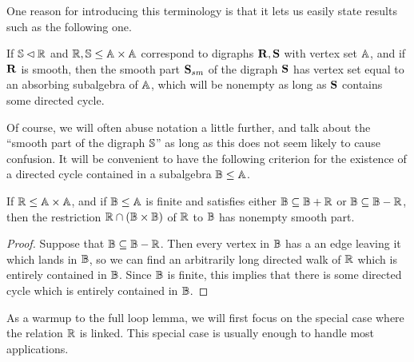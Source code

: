 \documentclass[letterpaper,11pt]{article}
\begin{document}
One reason for introducing this terminology is that it lets us easily state results such as the following one.

\begin{prop} If $\mathbb{S} \lhd \mathbb{R}$ and $\mathbb{R},\mathbb{S} \le \mathbb{A}\times \mathbb{A}$ correspond to digraphs $\mathbf{R}, \mathbf{S}$ with vertex set $\mathbb{A}$, and if $\mathbf{R}$ is smooth, then the smooth part $\mathbf{S}_{sm}$ of the digraph $\mathbf{S}$ has vertex set equal to an absorbing subalgebra of $\mathbb{A}$, which will be nonempty as long as $\mathbf{S}$ contains some directed cycle.
\end{prop}

Of course, we will often abuse notation a little further, and talk about the ``smooth part of the digraph $\mathbb{S}$'' as long as this does not seem likely to cause confusion. It will be convenient to have the following criterion for the existence of a directed cycle contained in a subalgebra $\mathbb{B} \le \mathbb{A}$.

\begin{prop} If $\mathbb{R} \le \mathbb{A} \times \mathbb{A}$, and if $\mathbb{B} \le \mathbb{A}$ is finite and satisfies either $\mathbb{B} \subseteq \mathbb{B} + \mathbb{R}$ or $\mathbb{B} \subseteq \mathbb{B}-\mathbb{R}$, then the restriction $\mathbb{R} \cap (\mathbb{B} \times \mathbb{B})$ of $\mathbb{R}$ to $\mathbb{B}$ has nonempty smooth part.
\end{prop}
\begin{proof} Suppose that $\mathbb{B} \subseteq \mathbb{B} - \mathbb{R}$. Then every vertex in $\mathbb{B}$ has a an edge leaving it which lands in $\mathbb{B}$, so we can find an arbitrarily long directed walk of $\mathbb{R}$ which is entirely contained in $\mathbb{B}$. Since $\mathbb{B}$ is finite, this implies that there is some directed cycle which is entirely contained in $\mathbb{B}$.
\end{proof}

As a warmup to the full loop lemma, we will first focus on the special case where the relation $\mathbb{R}$ is linked. This special case is usually enough to handle most applications.
\end{document}
